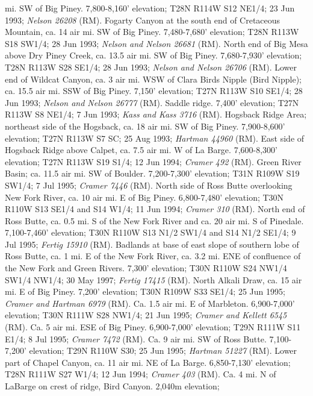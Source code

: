 mi. SW of Big Piney. 7,800-8,160’ elevation; T28N R114W S12 NE1/4; 23 Jun 1993;
\textit{Nelson 26208} (RM).
Fogarty Canyon at the south end of Cretaceous Mountain, ca. 14 air mi. SW of
Big Piney. 7,480-7,680’ elevation; T28N R113W S18 SW1/4; 28 Jun 1993;
\textit{Nelson and Nelson 26681} (RM).
North end of Big Mesa above Dry Piney Creek, ca. 13.5 air mi. SW of Big Piney.
7,680-7,930' elevation; T28N R113W S28	SE1/4; 28 Jun 1993;
\textit{Nelson and Nelson 26706} (RM).
Lower end of Wildcat Canyon, ca. 3 air mi. WSW of Clara Birds Nipple
(Bird Nipple); ca. 15.5 air mi. SSW of Big Piney. 7,150’ elevation;
T27N R113W S10 SE1/4; 28 Jun 1993; \textit{Nelson and Nelson 26777} (RM).
Saddle ridge. 7,400’ elevation; T27N R113W S8 NE1/4; 7 Jun 1993;
\textit{Kass and Kass 3716} (RM).
Hogsback Ridge Area; northeast side of the Hogsback, ca. 18 air mi. SW of
Big Piney. 7,900-8,600’ elevation; T27N R113W S7 SC; 25 Aug 1993;
\textit{Hartman 44960} (RM).
East side of Hogsback Ridge above Calpet, ca. 7.5 air mi. W of La Barge.
7,600-8,300’ elevation; T27N R113W S19 S1/4; 12 Jun 1994;
\textit{Cramer 492} (RM).
Green River Basin; ca. 11.5 air mi. SW of Boulder. 7,200-7,300’ elevation;
T31N R109W S19 SW1/4; 7 Jul 1995; \textit{Cramer 7446} (RM).
North side of Ross Butte overlooking New Fork River, ca. 10 air mi. E of
Big Piney. 6,800-7,480’ elevation; T30N R110W S13 SE1/4 and S14 W1/4;
11 Jun 1994; \textit{Cramer 310} (RM).
North end of Ross Butte, ca. 0.5 mi. S of the New Fork River and ca. 20 air mi.
S of Pinedale. 7,100-7,460’ elevation; T30N R110W S13 N1/2 SW1/4 and
S14 N1/2 SE1/4; 9 Jul 1995; \textit{Fertig 15910} (RM).
Badlands at base of east slope of southern lobe of Ross Butte, ca. 1 mi. E of
the New Fork River, ca. 3.2 mi. ENE of confluence of the New Fork and Green
Rivers. 7,300’ elevation; T30N R110W S24 NW1/4 SW1/4 NW1/4; 30 May 1997;
\textit{Fertig 17415} (RM).
North Alkali Draw, ca. 15 air mi. E of Big Piney. 7,200’ elevation;
T30N R109W S33 SE1/4; 25 Jun 1995; \textit{Cramer and Hartman 6979} (RM).
Ca. 1.5 air mi. E of Marbleton. 6,900-7,000’ elevation; T30N R111W S28 NW1/4;
21 Jun 1995; \textit{Cramer and Kellett 6545} (RM).
Ca. 5 air mi. ESE of Big Piney. 6,900-7,000’ elevation; T29N R111W S11 E1/4;
8 Jul 1995; \textit{Cramer 7472} (RM).
Ca. 9 air mi. SW of Ross Butte. 7,100-7,200’ elevation; T29N R110W S30;
25 Jun 1995; \textit{Hartman 51227} (RM).
Lower part of Chapel Canyon, ca. 11 air mi. NE of La Barge.
6,850-7,130’ elevation; T28N R111W S27 W1/4; 12 Jun 1994;
\textit{Cramer 403} (RM).
Ca. 4 mi. N of LaBarge on crest of ridge, Bird Canyon. 2,040m elevation;
